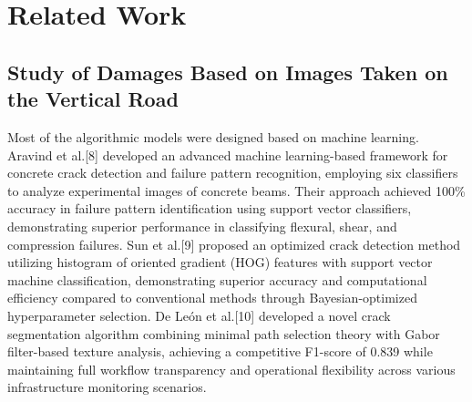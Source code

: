 \documentclass[sensors,article,submit,moreauthors]{Definitions/mdpi}
\begin{document}

%    


    \section{Related Work}

    \subsection{Study of Damages Based on Images Taken on the Vertical Road}

    Most of the algorithmic models were designed based on machine learning. Aravind et al.[8]\citep{aravind2021machine} developed an advanced machine learning-based framework for concrete crack detection and failure pattern recognition, employing six classifiers to analyze experimental images of concrete beams. Their approach achieved 100\% accuracy in failure pattern identification using support vector classifiers, demonstrating superior performance in classifying flexural, shear, and compression failures. Sun et al.[9]\citep{sun2023employing} proposed an optimized crack detection method utilizing histogram of oriented gradient (HOG) features with support vector machine classification, demonstrating superior accuracy and computational efficiency compared to conventional methods through Bayesian-optimized hyperparameter selection. De León et al.[10]\citep{deleon2023new} developed a novel crack segmentation algorithm combining minimal path selection theory with Gabor filter-based texture analysis, achieving a competitive F1-score of 0.839 while maintaining full workflow transparency and operational flexibility across various infrastructure monitoring scenarios.
\end{document}
